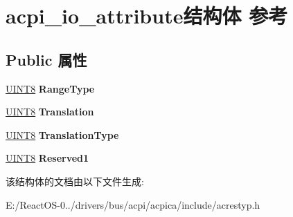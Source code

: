 \hypertarget{structacpi__io__attribute}{}\section{acpi\+\_\+io\+\_\+attribute结构体 参考}
\label{structacpi__io__attribute}
\subsection*{Public 属性}
\begin{DoxyCompactItemize}
\item 
\mbox{\label{structacpi__io__attribute_a71b0154dca0ff150a5cf719b944a9a11}} 
\hyperlink{_processor_bind_8h_ab27e9918b538ce9d8ca692479b375b6a}{U\+I\+N\+T8} {\bfseries Range\+Type}
\item 
\mbox{\label{structacpi__io__attribute_a3779904bd87e985df1d7ec10b5ae7c4a}} 
\hyperlink{_processor_bind_8h_ab27e9918b538ce9d8ca692479b375b6a}{U\+I\+N\+T8} {\bfseries Translation}
\item 
\mbox{\label{structacpi__io__attribute_ac8b57aa6d6920527db5b14589d0c0d19}} 
\hyperlink{_processor_bind_8h_ab27e9918b538ce9d8ca692479b375b6a}{U\+I\+N\+T8} {\bfseries Translation\+Type}
\item 
\mbox{\label{structacpi__io__attribute_a98ab6faf5ca57e0b91d273898b31e9ad}} 
\hyperlink{_processor_bind_8h_ab27e9918b538ce9d8ca692479b375b6a}{U\+I\+N\+T8} {\bfseries Reserved1}
\end{DoxyCompactItemize}


该结构体的文档由以下文件生成\+:\begin{DoxyCompactItemize}
\item 
E\+:/\+React\+O\+S-\/0../drivers/bus/acpi/acpica/include/acrestyp.\+h\end{DoxyCompactItemize}
